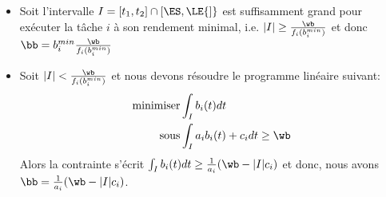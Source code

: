 \begin{itemize}
\item Soit l'intervalle $I={[}t_1,t_2{]}\cap {[}\ES,\LE{]}$ est suffisamment grand pour exécuter la tâche $i$ à son rendement minimal, i.e. $|I| \ge \frac{\wb}{f_i(b_i^{min})}$ et donc $\bb=b_i^{min}\frac{\wb}{f_i(b_i^{min})}$
	
\item Soit $|I| < \frac{\wb}{f_i(b_i^{min})}$ et nous devons résoudre le programme linéaire suivant:
  \begin{alignat*}{2}
    \text{minimiser}   & \int_{I} b_i(t)dt  \\
    \text{sous} & \int_{I} a_ib_i(t)+c_idt \ge \wb
  \end{alignat*}
  Alors la contrainte s'écrit $\int_{I} b_i(t)dt \ge \frac{1}{a_i}(\wb-|I|c_i)$ et donc, nous avons $\bb= \frac{1}{a_i}(\wb-|I|c_i)$.\\
\end{itemize}

